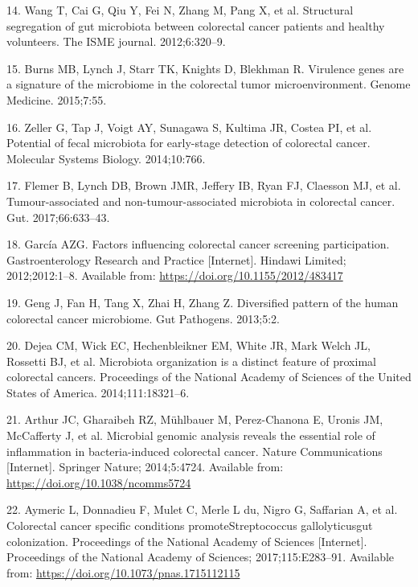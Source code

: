 \documentclass[12pt,]{article}
\begin{document}
\hypertarget{ref-wang_structural_2012}{}
14. Wang T, Cai G, Qiu Y, Fei N, Zhang M, Pang X, et al. Structural
segregation of gut microbiota between colorectal cancer patients and
healthy volunteers. The ISME journal. 2012;6:320--9.

\hypertarget{ref-burns_virulence_2015}{}
15. Burns MB, Lynch J, Starr TK, Knights D, Blekhman R. Virulence genes
are a signature of the microbiome in the colorectal tumor
microenvironment. Genome Medicine. 2015;7:55.

\hypertarget{ref-zeller_potential_2014}{}
16. Zeller G, Tap J, Voigt AY, Sunagawa S, Kultima JR, Costea PI, et al.
Potential of fecal microbiota for early-stage detection of colorectal
cancer. Molecular Systems Biology. 2014;10:766.

\hypertarget{ref-flemer_tumour-associated_2017}{}
17. Flemer B, Lynch DB, Brown JMR, Jeffery IB, Ryan FJ, Claesson MJ, et
al. Tumour-associated and non-tumour-associated microbiota in colorectal
cancer. Gut. 2017;66:633--43.

\hypertarget{ref-GimenoGarca2012}{}
18. García AZG. Factors influencing colorectal cancer screening
participation. Gastroenterology Research and Practice {[}Internet{]}.
Hindawi Limited; 2012;2012:1--8. Available from:
\url{https://doi.org/10.1155/2012/483417}

\hypertarget{ref-geng_diversified_2013}{}
19. Geng J, Fan H, Tang X, Zhai H, Zhang Z. Diversified pattern of the
human colorectal cancer microbiome. Gut Pathogens. 2013;5:2.

\hypertarget{ref-dejea_microbiota_2014}{}
20. Dejea CM, Wick EC, Hechenbleikner EM, White JR, Mark Welch JL,
Rossetti BJ, et al. Microbiota organization is a distinct feature of
proximal colorectal cancers. Proceedings of the National Academy of
Sciences of the United States of America. 2014;111:18321--6.

\hypertarget{ref-ecoli_Arthur_2014}{}
21. Arthur JC, Gharaibeh RZ, Mühlbauer M, Perez-Chanona E, Uronis JM,
McCafferty J, et al. Microbial genomic analysis reveals the essential
role of inflammation in bacteria-induced colorectal cancer. Nature
Communications {[}Internet{]}. Springer Nature; 2014;5:4724. Available
from: \url{https://doi.org/10.1038/ncomms5724}

\hypertarget{ref-strep_Aymeric_2017}{}
22. Aymeric L, Donnadieu F, Mulet C, Merle L du, Nigro G, Saffarian A,
et al. Colorectal cancer specific conditions promoteStreptococcus
gallolyticusgut colonization. Proceedings of the National Academy of
Sciences {[}Internet{]}. Proceedings of the National Academy of
Sciences; 2017;115:E283--91. Available from:
\url{https://doi.org/10.1073/pnas.1715112115}
\end{document}
